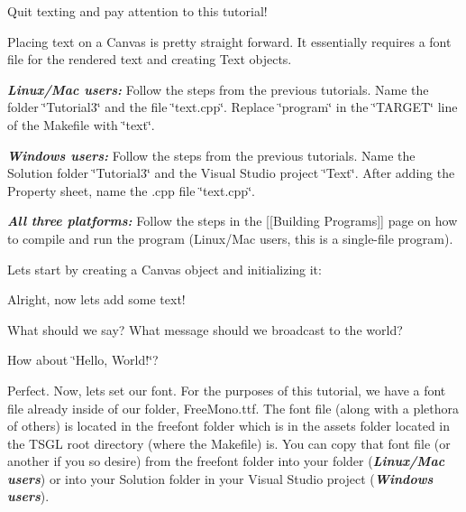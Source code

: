 Quit texting and pay attention to this tutorial!

Placing text on a Canvas is pretty straight forward. It essentially requires a font file for the rendered text and creating Text objects.

{\itshape {\bfseries{Linux/\+Mac users\+:}}} Follow the steps from the previous tutorials. Name the folder \char`\"{}\+Tutorial3\char`\"{} and the file \char`\"{}text.\+cpp\char`\"{}. Replace \char`\"{}program\char`\"{} in the \char`\"{}\+T\+A\+R\+G\+E\+T\char`\"{} line of the Makefile with \char`\"{}text\char`\"{}.

{\itshape {\bfseries{Windows users\+:}}} Follow the steps from the previous tutorials. Name the Solution folder \char`\"{}\+Tutorial3\char`\"{} and the Visual Studio project \char`\"{}\+Text\char`\"{}. After adding the Property sheet, name the .cpp file \char`\"{}text.\+cpp\char`\"{}.

{\itshape {\bfseries{All three platforms\+:}}} Follow the steps in the \mbox{[}\mbox{[}Building Programs\mbox{]}\mbox{]} page on how to compile and run the program (Linux/\+Mac users, this is a single-\/file program).

Let\textquotesingle{}s start by creating a Canvas object and initializing it\+:


\begin{DoxyCode}{0}
\DoxyCodeLine{\textcolor{preprocessor}{\#include <tsgl.h>}}
\DoxyCodeLine{}
\DoxyCodeLine{\}}
\end{DoxyCode}


Alright, now let\textquotesingle{}s add some text!

What should we say? What message should we broadcast to the world?

How about \char`\"{}\+Hello, World!\char`\"{}?

Perfect. Now, let\textquotesingle{}s set our font. For the purposes of this tutorial, we have a font file already inside of our folder, {\ttfamily Free\+Mono.\+ttf}. The font file (along with a plethora of others) is located in the {\ttfamily freefont} folder which is in the {\ttfamily assets} folder located in the T\+S\+GL root directory (where the {\ttfamily Makefile}) is. You can copy that font file (or another if you so desire) from the {\ttfamily freefont} folder into your folder ({\itshape {\bfseries{Linux/\+Mac users}}}) or into your Solution folder in your Visual Studio project ({\itshape {\bfseries{Windows users}}}).

